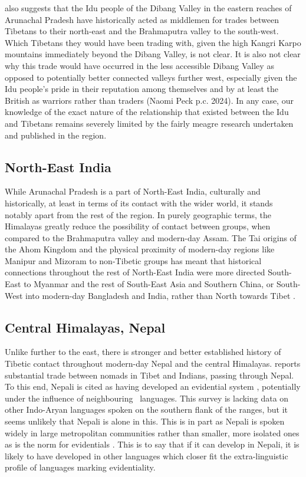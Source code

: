  also suggests that the Idu people of the Dibang Valley in the eastern reaches of Arunachal Pradesh have historically acted as middlemen for trades between Tibetans to their north-east and the Brahmaputra valley to the south-west. Which Tibetans they would have been trading with, given the high Kangri Karpo mountains immediately beyond the Dibang Valley, is not clear. It is also not clear why this trade would have occurred in the less accessible Dibang Valley as opposed to potentially better connected valleys further west, especially given the Idu people's pride in their reputation among themselves and by at least the British as warriors rather than traders (Naomi Peck p.c. 2024). In any case, our knowledge of the exact nature of the relationship that existed between the Idu and Tibetans remains severely limited by the fairly meagre research undertaken and published in the region.


\subsection{North-East India}
While Arunachal Pradesh is a part of North-East India, culturally and historically, at least in terms of its contact with the wider world, it stands notably apart from the rest of the region. In purely geographic terms, the Himalayas greatly reduce the possibility of contact between groups, when compared to the Brahmaputra valley and modern-day Assam. The Tai origins of the Ahom Kingdom and the physical proximity of modern-day regions like Manipur and Mizoram to non-Tibetic groups has meant that historical connections throughout the rest of North-East India were more directed South-East to Myanmar and the rest of South-East Asia and Southern China, or South-West into modern-day Bangladesh and India, rather than North towards Tibet \cite{Gogoi1968}.

\subsection{Central Himalayas, Nepal}
Unlike further to the east, there is stronger and better established history of Tibetic contact throughout modern-day Nepal and the central Himalayas.  reports substantial trade between nomads in Tibet and Indians, passing through Nepal. To this end, Nepali is cited as having developed an evidential system \cite{Bashir2006}, potentially under the influence of neighbouring \lfam\ languages. This survey is lacking data on other Indo-Aryan languages spoken on the southern flank of the ranges, but it seems unlikely that Nepali is alone in this. This is in part as Nepali is spoken widely in large metropolitan communities rather than smaller, more isolated ones as is the norm for evidentials \cite[359]{Aikhenvald2004}. This is to say that if it can develop in Nepali, it is likely to have developed in other languages which closer fit the extra-linguistic profile of languages marking evidentiality.

